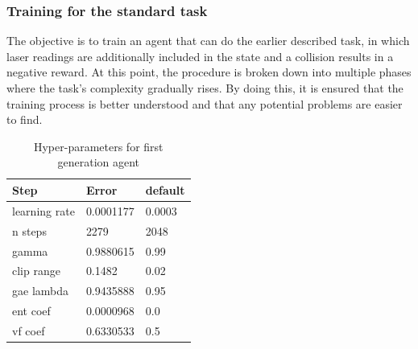 \documentclass[conference]{IEEEtran}
\begin{document}
\subsubsection{Training for the standard task}
The objective is to train an agent that can do the earlier described task, in which laser readings are additionally included in the state and a collision results in a negative reward. At this point, the procedure is broken down into multiple phases where the task's complexity gradually rises. By doing this, it is ensured that the training process is better understood and that any potential problems are easier to find.
\begin{itemize}



    \begin{table}[]
    \centering
    \begin{tabular}{|l|l|l|}
    \hline
    \textbf{Step}            & \textbf{Error} &  default \\ \hline
     learning rate     &  0.0001177 &  0.0003        \\ \hline
    n steps             & 2279 &  2048         \\ \hline
    gamma               &  0.9880615 &  0.99        \\ \hline
    clip range          & 0.1482 & 0.02        \\ \hline
    gae lambda       & 0.9435888 &  0.95       \\ \hline
    ent coef       & 0.0000968 &  0.0         \\ \hline
    vf coef        & 0.6330533 &  0.5        \\ \hline
    \end{tabular}
    \caption{Hyper-parameters for first generation agent}
    \end{table}



\end{itemize}
\end{document}
